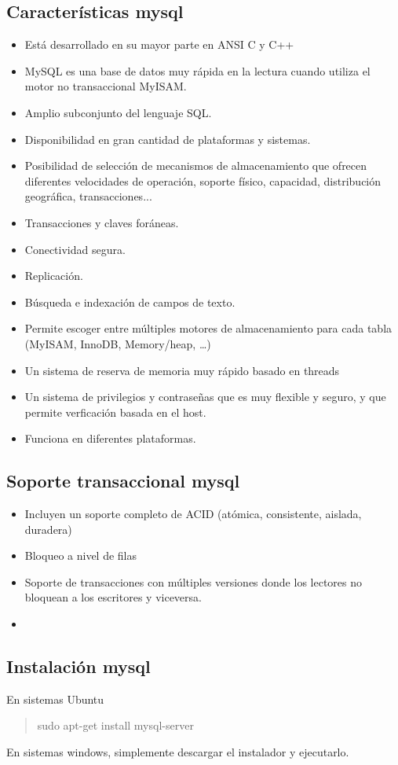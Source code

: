 \documentclass[4paper]{article}
\newcommand{\M}{mysql}
\begin{document}
\subsection{Características \M}
\begin{itemize}
\item Está desarrollado en su mayor parte en ANSI C y C++
\item MySQL es una base de datos muy rápida en la lectura cuando utiliza el motor no transaccional MyISAM.
\item Amplio subconjunto del lenguaje SQL.
\item Disponibilidad en gran cantidad de plataformas y sistemas.
\item Posibilidad de selección de mecanismos de almacenamiento que ofrecen diferentes velocidades de operación, soporte físico, capacidad, distribución geográfica, transacciones...
\item Transacciones y claves foráneas.
\item Conectividad segura.
\item Replicación.
\item Búsqueda e indexación de campos de texto.
\item Permite escoger entre múltiples motores de almacenamiento para cada tabla (MyISAM, InnoDB, Memory/heap, \dots)
\item Un sistema de reserva de memoria muy rápido basado en threads
\item Un sistema de privilegios y contraseñas que es muy flexible y seguro, y que permite verficación basada en el host.
\item Funciona en diferentes plataformas.
\end{itemize}

\subsection{Soporte transaccional \M}
\begin{itemize}
\item Incluyen un soporte completo de ACID (atómica, consistente, aislada, duradera)
\item Bloqueo a nivel de filas
\item Soporte de transacciones con múltiples versiones donde los lectores no bloquean a los escritores y viceversa.
\item 
\end{itemize}

\subsection{Instalación \M}
En sistemas Ubuntu
\begin{quote}
sudo apt-get install mysql-server
\end{quote}
En sistemas windows, simplemente descargar el instalador y ejecutarlo.
\end{document}
